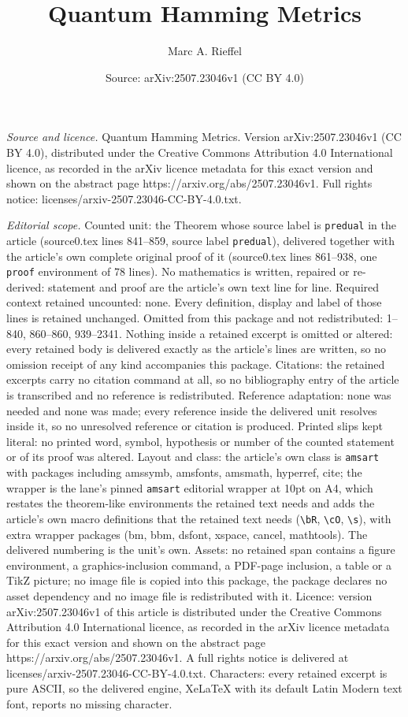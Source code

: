 \documentclass[10pt,a4paper]{amsart}
\title[Quantum Hamming Metrics]{Quantum Hamming Metrics}
\author{Marc A. Rieffel}
\date{Source: arXiv:2507.23046v1 (CC BY 4.0)}
\begin{document}
\maketitle

\noindent\emph{Source and licence.} Quantum Hamming Metrics. Version arXiv:2507.23046v1 (CC BY 4.0), distributed under the Creative Commons Attribution 4.0 International licence, as recorded in the arXiv licence metadata for this exact version and shown on the abstract page https://arxiv.org/abs/2507.23046v1. Full rights notice: licenses/arxiv-2507.23046-CC-BY-4.0.txt.\par\smallskip

\noindent\textit{Editorial scope.} Counted unit: the Theorem whose source label is \texttt{predual} in the article (source0.tex lines 841--859, source label \texttt{predual}), delivered together with the article's own complete original proof of it (source0.tex lines 861--938, one \texttt{proof} environment of 78 lines). No mathematics is written, repaired or re-derived: statement and proof are the article's own text line for line. Required context retained uncounted: none. Every definition, display and label of those lines is retained unchanged. Omitted from this package and not redistributed: 1--840, 860--860, 939--2341. Nothing inside a retained excerpt is omitted or altered: every retained body is delivered exactly as the article's lines are written, so no omission receipt of any kind accompanies this package. Citations: the retained excerpts carry no citation command at all, so no bibliography entry of the article is transcribed and no reference is redistributed. Reference adaptation: none was needed and none was made; every reference inside the delivered unit resolves inside it, so no unresolved reference or citation is produced. Printed slips kept literal: no printed word, symbol, hypothesis or number of the counted statement or of its proof was altered. Layout and class: the article's own class is \texttt{amsart} with packages including amssymb, amsfonts, amsmath, hyperref, cite; the wrapper is the lane's pinned \texttt{amsart} editorial wrapper at 10pt on A4, which restates the theorem-like environments the retained text needs and adds the article's own macro definitions that the retained text needs (\texttt{\textbackslash bR}, \texttt{\textbackslash cO}, \texttt{\textbackslash s}), with extra wrapper packages (bm, bbm, dsfont, xspace, cancel, mathtools). The delivered numbering is the unit's own. Assets: no retained span contains a figure environment, a graphics-inclusion command, a PDF-page inclusion, a table or a TikZ picture; no image file is copied into this package, the package declares no asset dependency and no image file is redistributed with it. Licence: version arXiv:2507.23046v1 of this article is distributed under the Creative Commons Attribution 4.0 International licence, as recorded in the arXiv licence metadata for this exact version and shown on the abstract page https://arxiv.org/abs/2507.23046v1. A full rights notice is delivered at licenses/arxiv-2507.23046-CC-BY-4.0.txt. Characters: every retained excerpt is pure ASCII, so the delivered engine, XeLaTeX with its default Latin Modern text font, reports no missing character.
\end{document}
